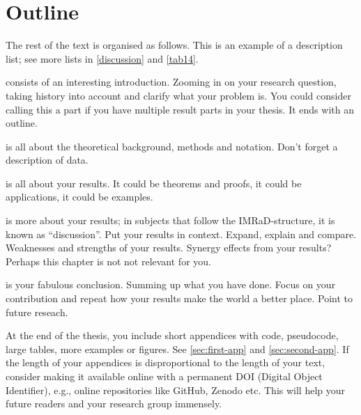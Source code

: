 \chapter{Outline}
\label{intro}

The rest of the text is organised as follows. This is an example of a description list; see more lists in \cref{discussion} and \vref{tab14}.
\begin{description}
    \item[\cref{intro}] consists of an interesting introduction. Zooming in on your research question, taking history into account and clarify what your problem is. You could consider calling this a part if you have multiple result parts in your thesis. It ends with an outline.
    \item[\cref{background}] is all about the theoretical background, methods and notation. Don't forget a description of data. 
    \item[\cref{results}] is all about your results. It could be theorems and proofs, it could be applications, it could be examples.
    \item[\cref{discussion}] is more about your results; in subjects that follow the IMRaD-structure, it is known as \enquote{discussion}. Put your results in context. Expand, explain and compare. Weaknesses and strengths of your results. Synergy effects from your results?  Perhaps this chapter is not not relevant for you.
    \item[\cref{conc}] is your fabulous conclusion. Summing up what you have done. Focus on your contribution and repeat how your results make the world a better place. Point to future reseach.
    \item At the end of the thesis, you include short appendices with code, pseudocode, large tables, more examples or figures. See \cref{sec:first-app} and \cref{sec:second-app}. If the length of your appendices is disproportional to the length of your text, consider making it available online with a permanent DOI (Digital Object Identifier), e.g., online repositories like GitHub, Zenodo etc. This will help your future readers and your research group immensely.
\end{description}